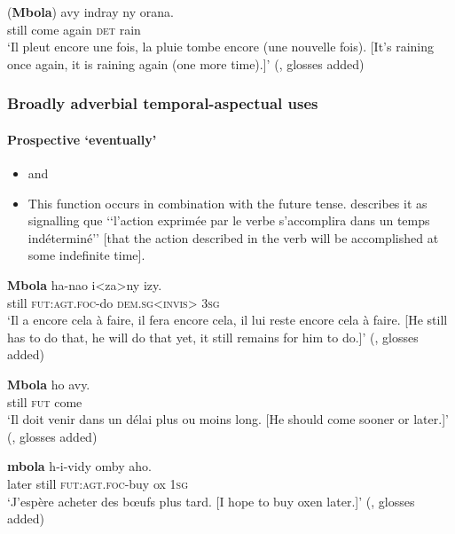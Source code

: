\begin{exe}
	\ex
	\label{exAppendixMalagasyIteration}
	\gll (\textbf{Mbola}) avy indray ny orana.\\
	still come again \textsc{det} rain\\
	\glt \lq Il pleut encore une fois, la pluie tombe encore (une nouvelle fois). [It's raining once again, it is raining again (one more time).]\rq{ }(\cite[537]{Dez1980}, glosses added)
\end{exe}

\subsubsection{Broadly adverbial temporal-aspectual uses}
\paragraph{Prospective \lq eventually\rq{}}\label{appendixMalagasyProspective}
\begin{itemize}
	\item \textcite[537]{Dez1980} and \textcite[173]{Ferrand1903}
	\item This function occurs in combination with the future tense. \textcite[173]{Ferrand1903} describes it as signalling que \lq\lq l'action exprimée par le verbe s'accomplira dans un temps indéterminé\rq\rq{ }[that the action described in the verb will be accomplished at some indefinite time].
\end{itemize}

\begin{exe}
	\ex
	\gll \textbf{Mbola} ha-nao i<za>ny izy.\\
	still \textsc{fut}:\textsc{agt}.\textsc{foc}-do \textsc{dem}.\textsc{sg}<\textsc{invis}> 3\textsc{sg}\\
	\glt \lq Il a encore cela à faire, il fera encore cela, il lui reste encore cela à faire.  [He still has to do that, he will do that yet, it still remains for him to do.]' (\cite[537]{Dez1980}, glosses added)
	
	\ex
	\gll \textbf{Mbola} ho avy.\\
	still \textsc{fut} come\\
	\glt \lq Il doit venir dans un délai plus ou moins long. [He should come sooner or later.]' (\cite[173]{Ferrand1903}, glosses added)
	
	\ex
	 \textbf{mbola} h-i-vidy omby aho.\\
	{later} still \textsc{fut}:\textsc{agt}.\textsc{foc}-buy ox 1\textsc{sg}\\
	\glt \lq J'espère acheter des bœufs plus tard. [I hope to buy oxen later.]\rq{ }(\cite[79]{Malzac1960}, glosses added)
\end{exe}

